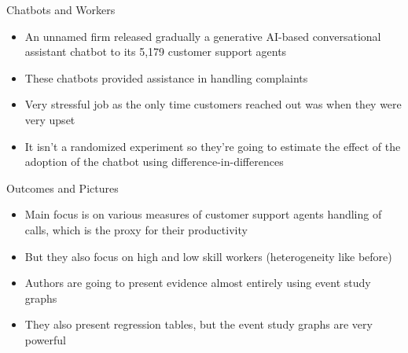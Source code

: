 \documentclass{beamer}
\begin{document}
\begin{frame}{Chatbots and Workers}

\begin{itemize}

\item An unnamed firm released gradually a generative AI-based conversational assistant chatbot to its  5,179 customer support agents 
\item These chatbots provided assistance in handling complaints
\item Very stressful job as the only time customers reached out was when they were very upset
\item It isn't a randomized experiment so they're going to estimate the effect of the adoption of the chatbot using difference-in-differences

\end{itemize}

\end{frame}

\begin{frame}{Outcomes and Pictures}

\begin{itemize}

\item Main focus is on various measures of customer support agents handling of calls, which is the proxy for their productivity
\item But they also focus on high and low skill workers (heterogeneity like before)
\item Authors are going to present evidence almost entirely using event study graphs
\item They also present regression tables, but the event study graphs are very powerful

\end{itemize}

\end{frame}
\end{document}
